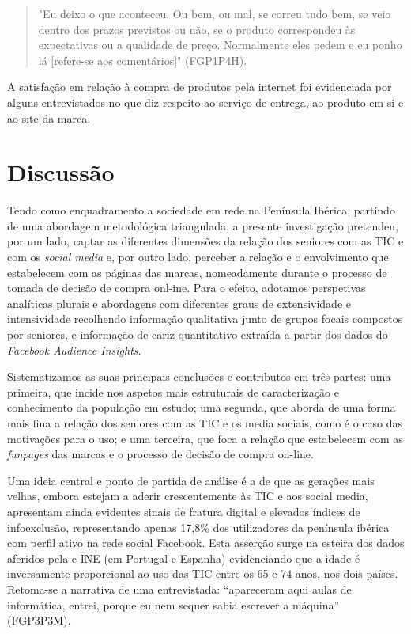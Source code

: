 \documentclass[portuguese]{textolivre}
\begin{document}
\begin{quote}
"Eu deixo o que aconteceu. Ou bem, ou mal, se correu tudo bem, se veio dentro dos prazos previstos ou não, se o produto correspondeu às expectativas ou a qualidade de preço. Normalmente eles pedem e eu ponho lá [refere-se aos comentários]" (FGP1P4H).
\end{quote}

A satisfação em relação à compra de produtos pela internet foi evidenciada por alguns entrevistados no que diz respeito ao serviço de entrega, ao produto em si e ao site da marca.

\section{Discussão}
Tendo como enquadramento a sociedade em rede na Península Ibérica, partindo de uma abordagem metodológica triangulada, a presente investigação pretendeu, por um lado, captar as diferentes dimensões da relação dos seniores com as TIC e com os \emph{social media} e, por outro lado, perceber a relação e o envolvimento que estabelecem com as páginas das marcas, nomeadamente durante o processo de tomada de decisão de compra onl-ine. Para o efeito, adotamos perspetivas analíticas plurais e abordagens com diferentes graus de extensividade e intensividade recolhendo informação qualitativa junto de grupos focais compostos por seniores, e informação de cariz quantitativo extraída a partir dos dados do \emph{Facebook Audience Insights}.

Sistematizamos as suas principais conclusões e contributos em três partes: uma primeira, que incide nos aspetos mais estruturais de caracterização e conhecimento da população em estudo; uma segunda, que aborda de uma forma mais fina a relação dos seniores com as TIC e os media sociais, como é o caso das motivações para o uso; e uma terceira, que foca a relação que estabelecem com as \emph{funpages} das marcas e o processo de decisão de compra on-line.

Uma ideia central e ponto de partida de análise é a de que as gerações mais velhas, embora estejam a aderir crescentemente às TIC e aos social media, apresentam ainda evidentes sinais de fratura digital \cite{gil2016} e elevados índices de infoexclusão, representando apenas 17,8\% dos utilizadores da península ibérica com perfil ativo na rede social Facebook. Esta asserção surge na esteira dos dados aferidos pela \textcite{eurostat2019} e INE (em Portugal e Espanha) evidenciando que a idade é inversamente proporcional ao uso das TIC entre os 65 e 74 anos, nos dois países. Retoma-se a narrativa de uma entrevistada: “apareceram aqui aulas de informática, entrei, porque eu nem sequer sabia escrever a máquina” (FGP3P3M).
\end{document}

